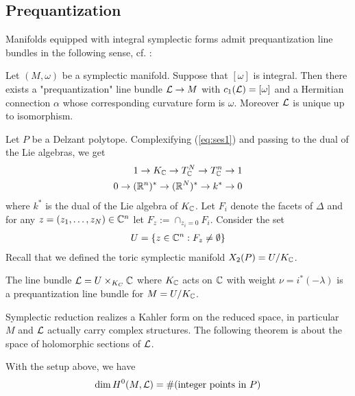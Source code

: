 \subsection{Prequantization}
Manifolds equipped with integral symplectic forms admit prequantization line bundles in the following sense, cf. \cite{lsg}:

\begin{theorem}
    Let $(M,\omega)$ be a symplectic manifold. Suppose that $[\omega]$ is integral. Then 
    there exists a "prequantization" line bundle ${\mathcal{L}} \to M$ with $c_1({\mathcal{L}}) = [\omega]$ and a Hermitian connection $\alpha$
    whose corresponding curvature form is $\omega$. Moreover ${\mathcal{L}}$ is unique up to isomorphism.
\end{theorem}

Let $P$ be a Delzant polytope. Complexifying (\ref{eq:ses1}) and passing to the dual of the Lie algebras, we get \begin{align*}
    1\to K_{\mathbb{C}} \to T_{\mathbb{C}}^N \to T_{\mathbb{C}}^n \to 1 \\
    0 \to (\mathbb{R}^n)^* \to (\mathbb{R}^N)^* \to k^* \to 0
\end{align*} where $k^*$ is the dual of the Lie algebra of $K_{\mathbb{C}}$. 
Let $F_i$ denote the facets of $\Delta$ and for any $z = (z_1,\dots,z_N)\in\mathbb{C}^n$ let $F_z := \cap_{z_i = 0}F_i$.
Consider the set \begin{align*}
    U = \{z\in\mathbb{C}^n: F_z \neq \emptyset\}
\end{align*} Recall that we defined the toric symplectic manifold $X_2(P) = U/K_{\mathbb{C}}$.

\begin{proposition}
    The line bundle ${\mathcal{L}} = U \times_{K_C} \mathbb{C}$ where $K_{\mathbb{C}}$ acts on $\mathbb{C}$ with 
    weight $\nu = i^*(-\lambda)$ is a prequantization line bundle for $M = U/K_{\mathbb{C}}$. 
\end{proposition}

Symplectic reduction realizes a Kahler form on the reduced space, in particular
$M$ and ${\mathcal{L}}$ actually carry complex structures. The following theorem is about the space of
holomorphic sections of ${\mathcal{L}}$.
\begin{theorem}
    With the setup above, we have \begin{align*}
        \dim H^0(M,{\mathcal{L}}) = \#(\text{integer points in } P)
    \end{align*}
\end{theorem}

